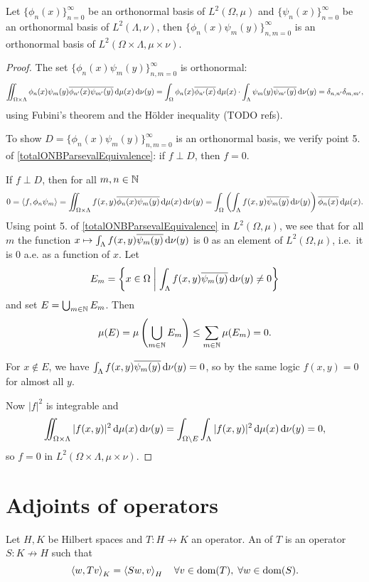 \begin{lemma}
Let $\{\phi_n(x)\}^\infty_{n=0}$ be an orthonormal basis of $L^2(\Omega, \mu)$ and $\{\psi_n(x)\}^\infty_{n=0}$ be an orthonormal basis of $L^2(\Lambda, \nu)$, then $\{\phi_n(x)\psi_m(y)\}^\infty_{n,m=0}$ is an orthonormal basis of $L^2(\Omega\times\Lambda, \mu\times\nu)$.
\end{lemma}
\begin{proof}
The set $\{\phi_n(x)\psi_m(y)\}^\infty_{n,m=0}$ is orthonormal:
\[ \iint_{\Omega\times\Lambda} \phi_n(x)\psi_m(y)\overline{\phi_{n'}(x)\psi_{m'}(y)}\operatorname{d \!}{\mu(x)}\operatorname{d \!}{\nu(y)} = \int_\Omega\phi_n(x)\overline{\phi_{n'}(x)}\operatorname{d \!}{\mu(x)} \cdot \int_\Lambda\psi_m(y)\overline{\psi_{m'}(y)}\operatorname{d \!}{\nu(y)} = \delta_{n,n'}\delta_{m,m'}, \]
using Fubini's theorem and the Hölder inequality (TODO refs).

To show $D = \{\phi_n(x)\psi_m(y)\}^\infty_{n,m=0}$ is an orthonormal basis, we verify point 5. of \ref{totalONBParsevalEquivalence}: if $f\perp D$, then $f = 0$.

If $f\perp D$, then for all $m,n\in \mathbb{N}$
\[ 0 = \left\langle f, \phi_n\psi_m \right\rangle = \iint_{\Omega\times\Lambda}f(x,y)\overline{\phi_n(x)\psi_m(y)}\operatorname{d \!}{\mu(x)}\operatorname{d \!}{\nu(y)} = \int_\Omega \left(\int_\Lambda f(x,y)\overline{\psi_m(y)}\operatorname{d \!}{\nu(y)} \right)\overline{\phi_n(x)}\operatorname{d \!}{\mu(x)}.  \]
Using point 5. of \ref{totalONBParsevalEquivalence} in $L^2(\Omega,\mu)$, we see that for all $m$ the function $x\mapsto\int_\Lambda f(x,y)\overline{\psi_m(y)}\operatorname{d \!}{\nu(y)}$ is $0$ as an element of $L^2(\Omega, \mu)$, i.e.\ it is $0$ a.e. as a function of $x$. Let
\[ E_m = \left\{ x\in\Omega \;\middle|\;  \int_\Lambda f(x,y)\overline{\psi_m(y)}\operatorname{d \!}{\nu(y)} \neq 0 \right\} \]
and set $E = \bigcup_{m\in\mathbb{N}}E_m$.
Then
\[ \mu(E) =  \mu\left(\bigcup_{m\in \mathbb{N}}E_m\right) \leq \sum_{m\in\mathbb{N}}\mu(E_m) = 0. \]

For $x\notin E$, we have $\int_\Lambda f(x,y)\overline{\psi_m(y)}\operatorname{d \!}{\nu(y)} = 0$, so by the same logic $f(x,y) = 0$ for almost all $y$. 

Now $|f|^2$ is integrable and
\[ \iint_{\Omega\times \Lambda}|f(x,y)|^2\operatorname{d \!}{\mu(x)}\operatorname{d \!}{\nu(y)} = \int_{\Omega\setminus E}\int_\Lambda |f(x,y)|^2\operatorname{d \!}{\mu(x)}\operatorname{d \!}{\nu(y)} = 0, \]
so $f=0$ in $L^2(\Omega\times\Lambda, \mu\times\nu)$.
\end{proof}


\section{Adjoints of operators}
\begin{definition}
Let $H,K$ be Hilbert spaces and $T: H\not\to K$ an operator. An  of $T$ is an operator $S: K\not\to H$ such that
\[ \left\langle w,Tv \right\rangle_K = \left\langle S w,v \right\rangle_H \quad \forall v\in \operatorname{dom}(T),\; \forall w\in \operatorname{dom}(S). \]
\end{definition}

